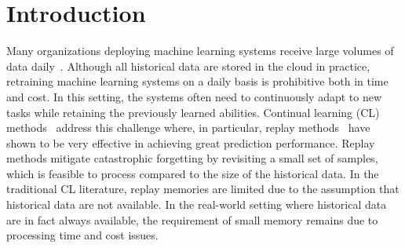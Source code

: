 
\section{Introduction}\label{paperC:sec:introduction}

Many organizations deploying machine learning systems receive large volumes of data daily~. Although all historical data are stored in the cloud in practice, retraining machine learning systems on a daily basis is prohibitive both in time and cost. In this setting, the systems often need to continuously adapt to new tasks while retaining the previously learned abilities. Continual learning (CL) methods~ address this challenge where, in particular, replay methods~ have shown to be very effective in achieving great prediction performance. 
Replay methods mitigate catastrophic forgetting by revisiting a small set of samples, which is feasible to process compared to the size of the historical data. In the traditional CL literature, replay memories are limited due to the assumption that historical data are not available. In the real-world setting where historical data are in fact always available, the requirement of small memory remains due to processing time and cost issues. 


